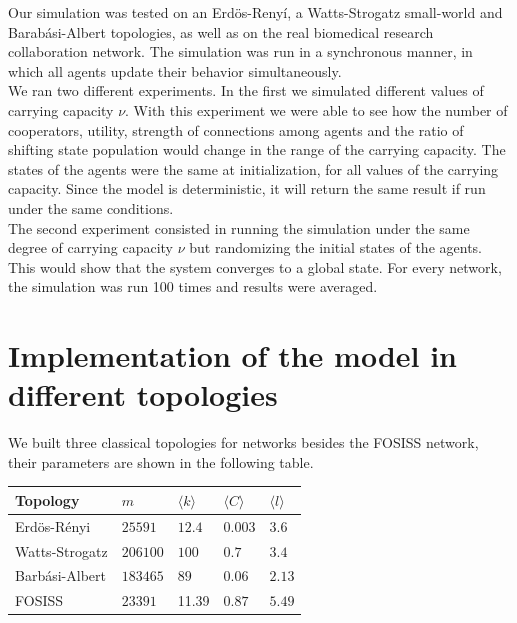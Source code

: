 \documentclass[11pt]{article}
\begin{document}
Our simulation was tested on an Erd\"{o}s-Reny\'i, a
Watts-Strogatz small-world and Barab\'asi-Albert topologies, as well
as on the real biomedical research collaboration network. The
simulation was run in a synchronous manner, in which all agents update their
behavior simultaneously. \\   

We ran two different experiments. In the first we simulated different
values of carrying capacity $\nu$. With this experiment we were able
to see how the number of cooperators, utility, strength of connections
among agents and the ratio of shifting state population would change
in the range of the carrying capacity. The states of the agents were
the same at initialization, for all values of the carrying
capacity. Since the model is deterministic, it will return the same
result if run under the same conditions.\\

The second experiment consisted in running the simulation under the
same degree of carrying capacity $\nu$ but randomizing the initial
states of the agents. This would show that the system converges to a
global state. For every network, the simulation was run 100 times and
results were averaged.

\section{Implementation of the model in different topologies}

We built three classical topologies for networks besides the FOSISS network, their parameters are shown in the following table.\\


\begin{tabular}{| l |  l | l |l|l|}
\hline
\bf{Topology}       & $m$              & $\langle k \rangle$          & $\langle C \rangle$      & $\langle l \rangle$ \\ \hline
Erd\"{o}s-R\'enyi  &  $25591$      &  $12.4$        &  $0.003$ & $3.6$  \\ \hline
Watts-Strogatz    &  $206100$   &  $100$         &  $0.7$      & $3.4$  \\ \hline
Barb\'asi-Albert    &  $183465$   &  $89$           &  $0.06$    & $2.13$ \\ \hline
FOSISS                    &  $23391$     &   11.39     &  $0.87$    &  $5.49$ \\ \hline
\end{tabular}\\ 
\end{document}
